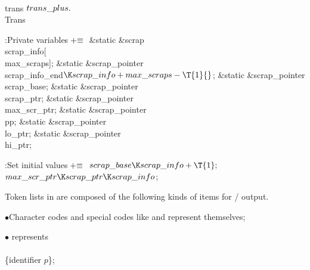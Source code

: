 \B\D\\{trans}\5
$\\{trans\_plus}.{}$\\{Trans}\par
\Y\B\4:Private variables\X${}\mathrel+\equiv{}$\6
\&{static} \&{scrap} \\{scrap\_info}[\\{max\_scraps}];\6
\&{static} \&{scrap\_pointer} \\{scrap\_info\_end}${}\K\\{scrap\_info}+\\{max%
\_scraps}-\T{1}{}$;\6
\&{static} \&{scrap\_pointer} \\{scrap\_base};\6
\&{static} \&{scrap\_pointer} \\{scrap\_ptr};\6
\&{static} \&{scrap\_pointer} \\{max\_scr\_ptr};\6
\&{static} \&{scrap\_pointer} \\{pp};\6
\&{static} \&{scrap\_pointer} \\{lo\_ptr};\6
\&{static} \&{scrap\_pointer} \\{hi\_ptr};\par
\fi

\B{}:Set initial values\X${}\mathrel+\equiv{}$\6
$\\{scrap\_base}\K\\{scrap\_info}+\T{1};{}$\6
${}\\{max\_scr\_ptr}\K\\{scrap\_ptr}\K\\{scrap\_info}{}$;\par
\fi

Token lists in  are composed of the following kinds of
items for \TEX/ output.

\yskip\item{$\bullet$}Character codes and special codes like  and
 represent themselves;

\item{$\bullet$} represents \.{\\\\\{{\rm identifier
$p$}\}};

